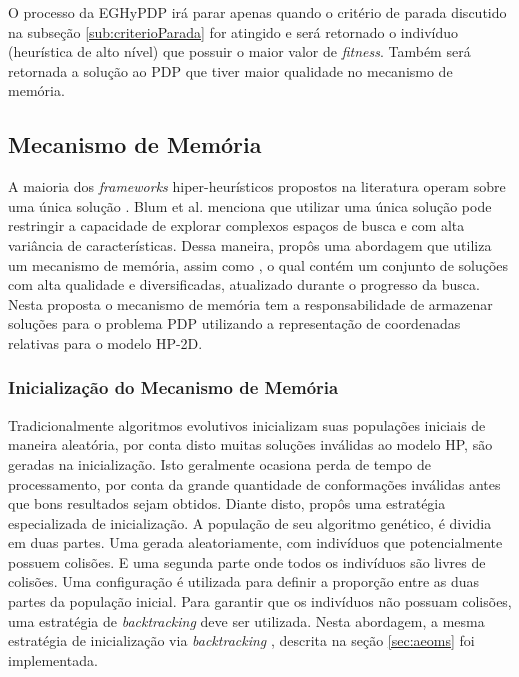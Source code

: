 

O processo da EGHyPDP irá parar apenas quando o critério de parada discutido na subseção \ref{sub:criterioParada} for atingido e será retornado o indivíduo (heurística de alto nível) que possuir o maior valor de \textit{fitness}. Também será retornada a solução ao PDP que tiver maior qualidade no mecanismo de memória.



\subsection{Mecanismo de Memória}
\label{sub:MecanismoDeMemoria}

A maioria dos \textit{frameworks} hiper-heurísticos propostos na literatura operam sobre uma única solução \cite{chakhlevitch2008hyperheuristics, burke2013hyper}. Blum et al. \cite{blum2011hybrid} menciona que utilizar uma única solução pode restringir a capacidade de explorar complexos espaços de busca e com alta variância de características. Dessa maneira,  \cite{sabar2015automatic} propôs uma abordagem que utiliza um mecanismo de memória, assim como  \cite{talbi2006cosearch}, o qual contém um conjunto de soluções com alta qualidade e diversificadas, atualizado durante o progresso da busca. Nesta proposta o mecanismo de memória tem a responsabilidade de armazenar soluções para o problema PDP utilizando a representação de coordenadas relativas para o modelo HP-2D. 

\subsubsection{Inicialização do Mecanismo de Memória}

Tradicionalmente algoritmos evolutivos inicializam suas populações iniciais de maneira aleatória, por conta disto  muitas soluções inválidas ao modelo HP, são geradas na inicialização. Isto geralmente  ocasiona perda de tempo de processamento, por conta da grande quantidade de conformações inválidas antes que bons resultados sejam obtidos. Diante disto, \cite{benitez2015algoritmo} propôs uma estratégia especializada de inicialização. A população de seu algoritmo genético, é dividia em duas partes. Uma gerada aleatoriamente, com indivíduos que potencialmente possuem colisões. E uma segunda parte onde todos os indivíduos são livres de colisões. Uma configuração é utilizada para definir a proporção entre as duas partes da população inicial. Para garantir que os indivíduos não possuam colisões, uma estratégia de \textit{backtracking} deve ser utilizada. Nesta abordagem, a mesma estratégia de inicialização via \textit{backtracking }, descrita  na seção \ref{sec:aeoms} foi implementada.





